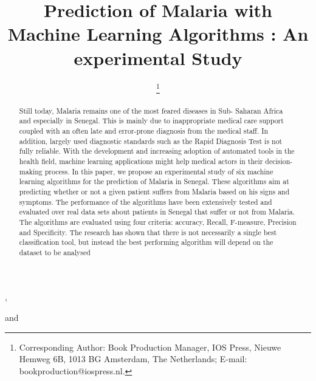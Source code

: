 \documentclass{IOS-Book-Article}
\def\hb{\hbox to 10.7 cm{}}
\begin{document}
\pagestyle{headings}
\def\thepage{}

\begin{frontmatter}              %


\title{Prediction of Malaria with Machine Learning
Algorithms : An experimental Study}

\markboth{}{November 2020\hb}

\author[A]{ %
\thanks{Corresponding Author: Book Production Manager, IOS Press, Nieuwe Hemweg 6B,
1013 BG Amsterdam, The Netherlands; E-mail:
bookproduction@iospress.nl.}},
\author[B]{ }
and
\author[B]{ }

\address[A]{ALioune Diop University of Bambey }
\address[B]{ALioune Diop University of Bambey}

\begin{abstract}
Still today, Malaria remains one of the most feared diseases in Sub- Saharan Africa and especially in Senegal. This is mainly due to inappropriate medical care support coupled with an often late and error-prone diagnosis from the medical staff. In addition, largely used diagnostic standards such as the Rapid Diagnosis Test is not fully reliable. With the development and increasing adoption of automated tools in the health field, machine learning applications might help medical actors in their decision-making process. In this paper, we propose an experimental study of six machine learning algorithms for the prediction of Malaria in Senegal. These algorithms aim at predicting whether or not a given patient suffers from Malaria based on his signs and symptoms. The performance of the algorithms have been extensively tested and evaluated over real data sets about patients in Senegal that suffer or not from Malaria. The algorithms are evaluated using four criteria: accuracy, Recall, F-measure, Precision and Specificity. The research has shown that there is not necessarily a single best classification tool, but instead the best performing algorithm will depend on the dataset to be analysed
\end{abstract}

\begin{keyword}

\end{keyword}
\end{frontmatter}
\end{document}
